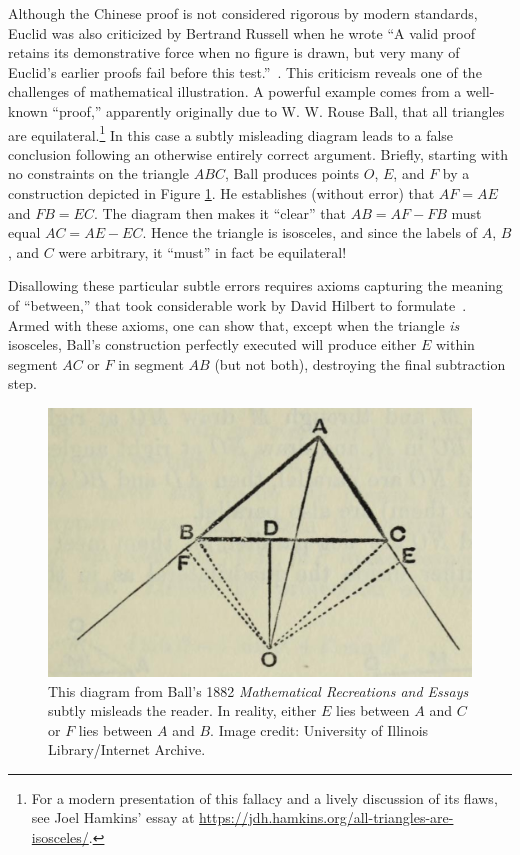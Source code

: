\documentclass{notices}
\begin{document}
Although the Chinese proof is not considered rigorous by modern standards, Euclid was also criticized by %
Bertrand Russell when he wrote ``A valid proof retains its demonstrative force when no figure is drawn, but very many of Euclid’s earlier proofs fail before this test.''~\cite{Russell:TE}. This criticism reveals one of the challenges of mathematical illustration.
 A powerful example comes from a well-known ``proof,'' apparently originally due to W. W. Rouse Ball, that all triangles are equilateral.\footnote{For a modern presentation of this fallacy and a lively discussion of its flaws, see Joel Hamkins' essay at \url{https://jdh.hamkins.org/all-triangles-are-isosceles/}.} In this case a subtly misleading diagram leads to a false conclusion following an otherwise entirely correct argument. Briefly, starting with no constraints on the triangle $ABC$, Ball produces points $O$, $E$, and $F$ by a construction depicted in Figure \ref{fig:BallFallacy}. He establishes (without error) that $AF=AE$ and $FB=EC$. The diagram then makes it ``clear'' that $AB = AF-FB$ must equal $AC = AE-EC$. Hence the triangle is isosceles, and since the labels of $A$, $B$, and $C$ were arbitrary, it ``must'' in fact be equilateral!
 
 Disallowing these particular subtle errors requires axioms capturing the meaning of ``between,'' that took considerable work by David Hilbert to formulate~\cites{Hilbert:FG, Lee:AG}. 
 Armed with these axioms, one can show that, except when the triangle \emph{is} isosceles, Ball's construction perfectly executed will produce either $E$ within segment $AC$ or $F$ in segment $AB$ (but not both), destroying the  final subtraction step.
\begin{figure}
    \includegraphics[width=1.\linewidth]{images/ballFallacyIllinois.png}
    \caption{This diagram from Ball's 1882 \emph{Mathematical Recreations and Essays} subtly misleads the reader. In reality, either $E$ lies between $A$ and $C$ or $F$ lies between $A$ and $B$. Image credit: University of Illinois Library/Internet Archive.}
    \label{fig:BallFallacy}
\end{figure}
\end{document}
